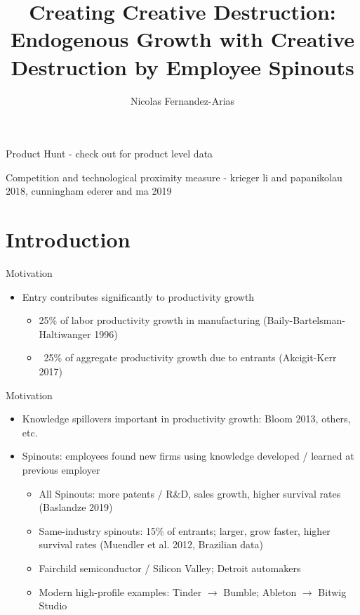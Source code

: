 \documentclass[english,usenames,dvipsnames]{beamer}
\title{Creating Creative Destruction: Endogenous Growth with Creative Destruction by Employee Spinouts}
\author{Nicolas Fernandez-Arias}
\begin{document}
	
Product Hunt - check out for product level data

Competition and technological proximity measure  - krieger li and papanikolau 2018, cunningham ederer and ma 2019

\maketitle

\section{Introduction}

\begin{frame}{Motivation}
\begin{itemize}
	\item Entry contributes significantly to productivity growth
	\begin{itemize}
		\item 25\% of labor productivity growth in manufacturing (Baily-Bartelsman-Haltiwanger 1996)
		\item ~25\% of aggregate productivity growth due to entrants (Akcigit-Kerr 2017)
	\end{itemize}
\end{itemize}
\end{frame}


\begin{frame}{Motivation}
\begin{itemize}
	\item Knowledge spillovers important in productivity growth: Bloom 2013, others, etc.
	\item Spinouts: employees found new firms using knowledge developed / learned at previous employer
	\begin{itemize}
		\item All Spinouts: more patents / R\&D, sales growth, higher survival rates (Baslandze 2019) 
		\item Same-industry spinouts: 15\% of entrants; larger, grow faster, higher survival rates (Muendler et al. 2012, Brazilian data)
		\item Fairchild semiconductor / Silicon Valley; Detroit automakers
		\item Modern high-profile examples: Tinder $\rightarrow$ Bumble; Ableton $\rightarrow$ Bitwig Studio
	\end{itemize}
\end{itemize}
\end{frame}
\end{document}

